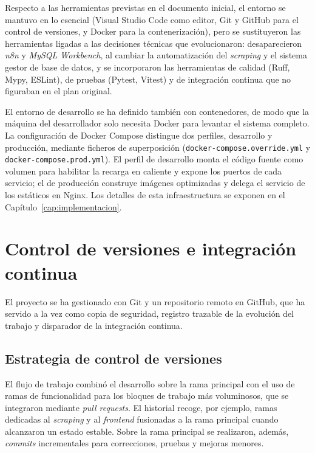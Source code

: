 Respecto a las herramientas previstas en el documento inicial, el entorno se
mantuvo en lo esencial (Visual Studio Code como editor, Git y GitHub para el
control de versiones, y Docker para la contenerización), pero se sustituyeron las
herramientas ligadas a las decisiones técnicas que evolucionaron: desaparecieron
\emph{n8n} y \emph{MySQL Workbench}, al cambiar la automatización del
\emph{scraping} y el sistema gestor de base de datos, y se incorporaron las
herramientas de calidad (Ruff, Mypy, ESLint), de pruebas (Pytest, Vitest) y de
integración continua que no figuraban en el plan original.

El entorno de desarrollo se ha definido también con contenedores, de modo que la
máquina del desarrollador solo necesita Docker para levantar el sistema completo.
La configuración de Docker Compose distingue dos perfiles, desarrollo y
producción, mediante ficheros de superposición
(\texttt{docker-compose.override.yml} y \texttt{docker-compose.prod.yml}). El
perfil de desarrollo monta el código fuente como volumen para habilitar la recarga
en caliente y expone los puertos de cada servicio; el de producción construye
imágenes optimizadas y delega el servicio de los estáticos en Nginx. Los detalles
de esta infraestructura se exponen en el Capítulo~\ref{cap:implementacion}.

\section{Control de versiones e integración continua}
\label{sec:met-ci}

El proyecto se ha gestionado con Git y un repositorio remoto en GitHub, que ha
servido a la vez como copia de seguridad, registro trazable de la evolución del
trabajo y disparador de la integración continua.

\subsection{Estrategia de control de versiones}
\label{sec:met-git}

El flujo de trabajo combinó el desarrollo sobre la rama principal con el uso de
ramas de funcionalidad para los bloques de trabajo más voluminosos, que se
integraron mediante \emph{pull requests}. El historial recoge, por ejemplo, ramas
dedicadas al \emph{scraping} y al \emph{frontend} fusionadas a la rama principal
cuando alcanzaron un estado estable. Sobre la rama principal se realizaron, además,
\emph{commits} incrementales para correcciones, pruebas y mejoras menores.

